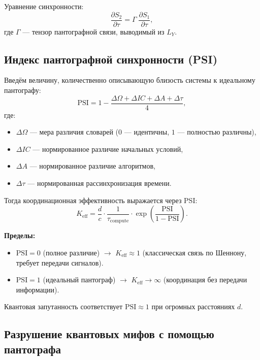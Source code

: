 \documentclass[12pt,a4paper]{article}
\begin{document}
	Уравнение синхронности:
	\[
	\frac{\partial S_2}{\partial \tau} = \Gamma \; \frac{\partial S_1}{\partial \tau},
	\]
	где \(\Gamma\) — тензор пантографной связи, выводимый из \(L_Y\).
	
	\subsection{Индекс пантографной синхронности (PSI)}
	
	Введём величину, количественно описывающую близость системы к идеальному пантографу:
	\[
	\mathrm{PSI} = 1 - \frac{\Delta\Omega + \Delta IC + \Delta A + \Delta\tau}{4},
	\]
	где:
	\begin{itemize}
		\item \(\Delta\Omega\) — мера различия словарей (\(0\) — идентичны, \(1\) — полностью различны),
		\item \(\Delta IC\) — нормированное различие начальных условий,
		\item \(\Delta A\) — нормированное различие алгоритмов,
		\item \(\Delta\tau\) — нормированная рассинхронизация времени.
	\end{itemize}
	
	Тогда координационная эффективность выражается через PSI:
	\[
	K_{\mathrm{eff}} = \frac{d}{c} \cdot \frac{1}{\tau_{\mathrm{compute}}} \cdot \exp\!\left( \frac{\mathrm{PSI}}{1 - \mathrm{PSI}} \right).
	\]
	
	\textbf{Пределы:}
	\begin{itemize}
		\item \(\mathrm{PSI} = 0\) (полное различие) \(\to\) \(K_{\mathrm{eff}} \approx 1\) (классическая связь по Шеннону, требует передачи сигналов).
		\item \(\mathrm{PSI} = 1\) (идеальный пантограф) \(\to\) \(K_{\mathrm{eff}} \to \infty\) (координация без передачи информации).
	\end{itemize}
	Квантовая запутанность соответствует \(\mathrm{PSI} \approx 1\) при огромных расстояниях \(d\).
	
	\subsection{Разрушение квантовых мифов с помощью пантографа}
	
\end{document}
